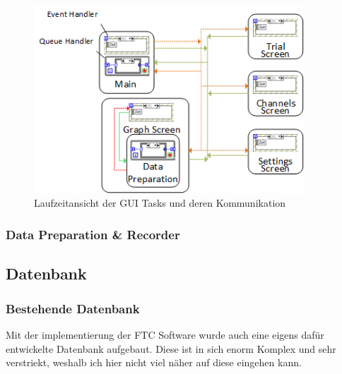 \documentclass[10pt]{scrartcl}
\begin{document}
\begin{figure}[htbp] 
	\centering
	\includegraphics[width=0.9\textwidth]{Laufzeitansicht}
	\caption{Laufzeitansicht der GUI Tasks und deren Kommunikation}
	\label{fig:LaufzeitansichtUDA}
\end{figure}

\subsubsection{Data Preparation \& Recorder}

\subsection{Datenbank}
\subsubsection{Bestehende Datenbank}
Mit der implementierung der FTC Software wurde auch eine eigens dafür entwickelte Datenbank aufgebaut. Diese ist in sich enorm Komplex und sehr verstriekt, weshalb ich hier nicht viel näher auf diese eingehen kann.
\end{document}
